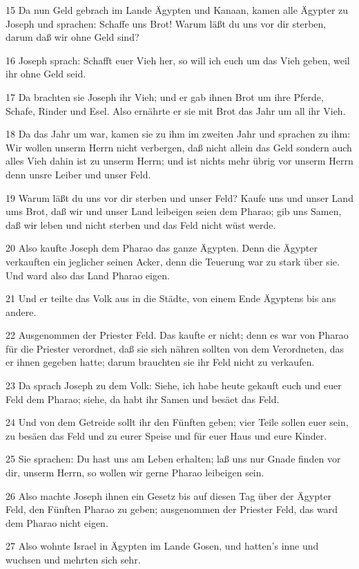 \par 15 Da nun Geld gebrach im Lande Ägypten und Kanaan, kamen alle Ägypter zu Joseph und sprachen: Schaffe uns Brot! Warum läßt du uns vor dir sterben, darum daß wir ohne Geld sind?
\par 16 Joseph sprach: Schafft euer Vieh her, so will ich euch um das Vieh geben, weil ihr ohne Geld seid.
\par 17 Da brachten sie Joseph ihr Vieh; und er gab ihnen Brot um ihre Pferde, Schafe, Rinder und Esel. Also ernährte er sie mit Brot das Jahr um all ihr Vieh.
\par 18 Da das Jahr um war, kamen sie zu ihm im zweiten Jahr und sprachen zu ihm: Wir wollen unserm Herrn nicht verbergen, daß nicht allein das Geld sondern auch alles Vieh dahin ist zu unserm Herrn; und ist nichts mehr übrig vor unserm Herrn denn unsre Leiber und unser Feld.
\par 19 Warum läßt du uns vor dir sterben und unser Feld? Kaufe uns und unser Land ums Brot, daß wir und unser Land leibeigen seien dem Pharao; gib uns Samen, daß wir leben und nicht sterben und das Feld nicht wüst werde.
\par 20 Also kaufte Joseph dem Pharao das ganze Ägypten. Denn die Ägypter verkauften ein jeglicher seinen Acker, denn die Teuerung war zu stark über sie. Und ward also das Land Pharao eigen.
\par 21 Und er teilte das Volk aus in die Städte, von einem Ende Ägyptens bis ans andere.
\par 22 Ausgenommen der Priester Feld. Das kaufte er nicht; denn es war von Pharao für die Priester verordnet, daß sie sich nähren sollten von dem Verordneten, das er ihnen gegeben hatte; darum brauchten sie ihr Feld nicht zu verkaufen.
\par 23 Da sprach Joseph zu dem Volk: Siehe, ich habe heute gekauft euch und euer Feld dem Pharao; siehe, da habt ihr Samen und besäet das Feld.
\par 24 Und von dem Getreide sollt ihr den Fünften geben; vier Teile sollen euer sein, zu besäen das Feld und zu eurer Speise und für euer Haus und eure Kinder.
\par 25 Sie sprachen: Du hast uns am Leben erhalten; laß uns nur Gnade finden vor dir, unserm Herrn, so wollen wir gerne Pharao leibeigen sein.
\par 26 Also machte Joseph ihnen ein Gesetz bis auf diesen Tag über der Ägypter Feld, den Fünften Pharao zu geben; ausgenommen der Priester Feld, das ward dem Pharao nicht eigen.
\par 27 Also wohnte Israel in Ägypten im Lande Gosen, und hatten's inne und wuchsen und mehrten sich sehr.
